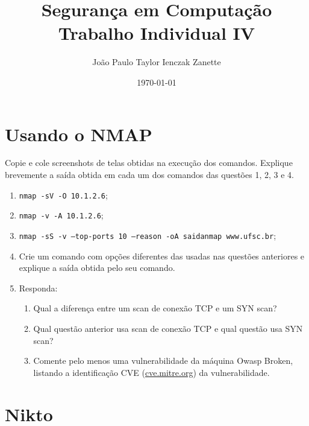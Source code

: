 \documentclass{article}
\title{%
    Segurança em Computação \\
    Trabalho Individual IV
}
\author{João Paulo Taylor Ienczak Zanette}
\date{\today}
\begin{document}
    \maketitle{}

    \section{Usando o NMAP}

    \begin{superframe}
        Copie e cole screenshots de telas obtidas na execução dos comandos.
        Explique brevemente a saída obtida em cada um dos comandos das questões
        1, 2, 3 e 4.

        \begin{enumerate}
            \item \texttt{nmap -sV -O 10.1.2.6};
            \item \texttt{nmap -v -A 10.1.2.6};
            \item \texttt{nmap -sS -v --top-ports 10 --reason -oA saidanmap www.ufsc.br};
            \item Crie um comando com opções diferentes das usadas nas questões
                anteriores e explique a saída obtida pelo seu comando.
            \item Responda:
                \begin{enumerate}
                    \item Qual a diferença entre um scan de conexão TCP e um
                        SYN scan?
                    \item Qual questão anterior usa scan de conexão TCP e qual
                        questão usa SYN scan?
                    \item Comente pelo menos uma vulnerabilidade da máquina
                        Owasp Broken, listando a identificação CVE
                        (\url{cve.mitre.org}) da vulnerabilidade.
                \end{enumerate}
        \end{enumerate}
    \end{superframe}

    \section{Nikto}
\end{document}
